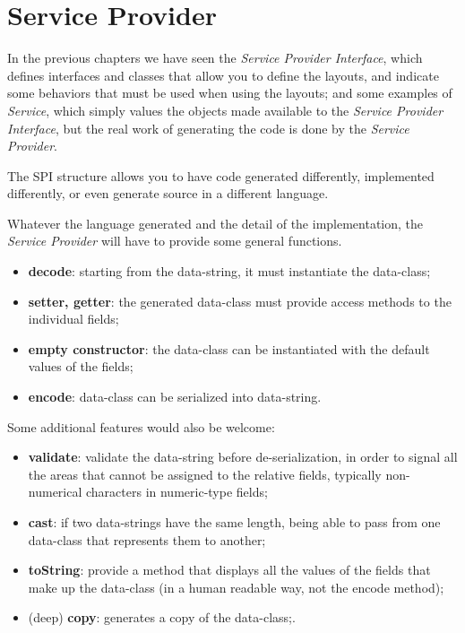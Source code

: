 \chapter{Service Provider}
In the previous chapters we have seen the \textsl{Service Provider Interface}, 
which defines interfaces and classes that allow you to define the layouts, and 
indicate some behaviors that must be used when using the layouts; 
and some examples of \textsl{Service}, which simply values the objects made 
available to the \textsl{Service Provider Interface}, but the real work of 
generating the code is done by the \textsl{Service Provider}.

The SPI structure allows you to have code generated differently, implemented 
differently, or even generate source in a different language.

Whatever the language generated and the detail of the implementation, the 
\textsl{Service Provider} will have to provide some general functions.

\begin{itemize}\setlength\itemsep{-0.5ex}
\item \textbf{decode}: starting from the data-string, it must instantiate the 
    data-class;
\item \textbf{setter, getter}: the generated data-class must provide access 
    methods to the individual fields;
\item \textbf{empty constructor}: the data-class can be instantiated with the 
    default values of the fields;
\item \textbf{encode}: data-class can be serialized into data-string.
\end{itemize}
Some additional features would also be welcome:
\begin{itemize}\setlength\itemsep{-0.5ex}
\item \textbf{validate}: validate the data-string before de-serialization, in 
    order to signal all the areas that cannot be assigned to the relative 
    fields, typically non-numerical characters in numeric-type fields;
\item \textbf{cast}: if two data-strings have the same length, being able to 
    pass from one data-class that represents them to another;
\item \textbf{toString}: provide a method that displays all the values of the 
    fields that make up the data-class (in a human readable way, not the encode 
    method);
\item (deep) \textbf{copy}: generates a copy of the data-class;.
\end{itemize}
